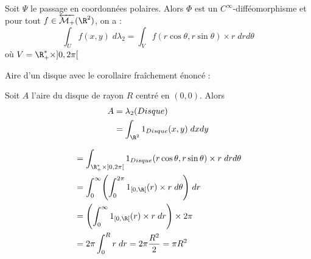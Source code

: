 \newpage
\begin{corollary}
    Soit $\Psi$ le passage en coordonnées polaires. Alors $\Phi$ est un $C^\infty$-difféomorphisme et 
    pour tout $f \in \overleftarrow{\mathcal{M}_+}(\R^2)$, on a :
        \[  \int_U f(x,y) \;d \lambda_2 = \int_V f(r \cos \theta, r \sin \theta) \times r \; dr d \theta \]
    où $V = \R_+^* \times ]0,2\pi[$
\end{corollary}

\begin{example}

    Aire d'un disque avec le corollaire fraîchement énoncé :

    \begin{minipage}{0.45\textwidth}
        Soit $A$ l'aire du disque de rayon $R$ centré en $(0,0)$.
        Alors
            \begin{align*}
                A &= \lambda_2(Disque) \\
                &= \int_{\R^2} 1_{Disque}(x,y) \; dxdy
            \end{align*}
    \end{minipage}
    \hfill 
    \begin{minipage}{0.45\textwidth}
        \begin{center}
        \end{center}
    \end{minipage}
    \begin{align*}
        &= \int_{\R_+^* \times ]0,2\pi[} 1_{Disque}(r \cos \theta, r \sin \theta) \times r \; dr d \theta \\
        &= \int_{0}^{\infty} \Biggl( \int_{0}^{2\pi} 1_{[0,\R[}(r) \times r \; d \theta \Biggr) \; dr \\
        &= \Biggl( \int_{0}^{\infty} 1_{[0,\R[}(r) \times r \; d r \Biggr) \times 2 \pi \\
        &= 2 \pi \int_{0}^{R} r \; dr = 2 \pi \frac{R^2}{2} = \pi R^2 
    \end{align*}
\end{example}

